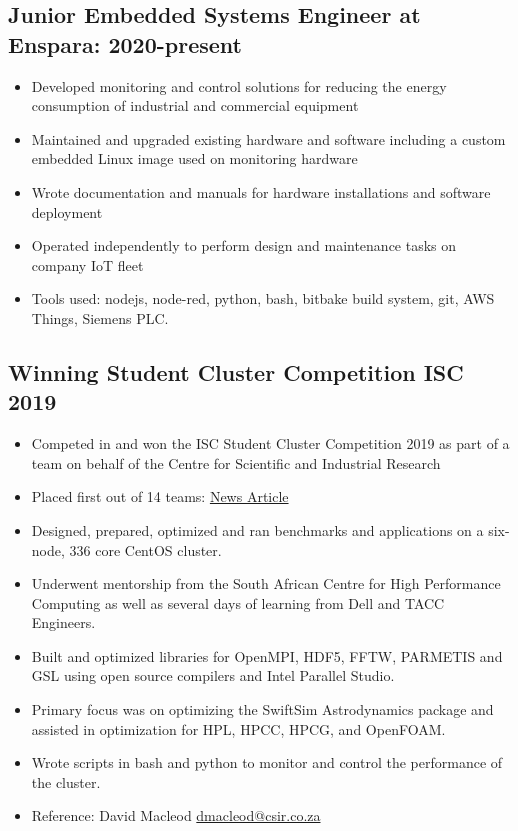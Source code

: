 \documentclass[10pt,a4paper,notitlepage]{article}
\begin{document}
\subsection*{Junior Embedded Systems Engineer at Enspara: 2020-present}
\begin{itemize}[noitemsep]
	\setlength\itemsep{0.02em}
    \item Developed monitoring and control solutions for reducing the energy consumption of industrial and commercial equipment
    \item Maintained and upgraded existing hardware and software including a custom embedded Linux image used on monitoring hardware
    \item Wrote documentation and manuals for hardware installations and software deployment
    \item Operated independently to perform design and maintenance tasks on company IoT fleet
    \item Tools used: nodejs, node-red, python, bash, bitbake build system, git, AWS Things, Siemens PLC.
\end{itemize}

\subsection*{Winning Student Cluster Competition ISC 2019}
\begin{itemize}[noitemsep]
	\setlength\itemsep{0.02em}
    \item Competed in and won the ISC Student Cluster Competition 2019 as part of a team on behalf of the Centre for Scientific and Industrial Research
    \item Placed first out of 14 teams: \href{https://www.chpc.ac.za/index.php/news2/241-south-africa-wins-international-student-cluster-competition-for-the-fourth-time}{News Article}
    \item Designed, prepared, optimized and ran benchmarks and applications on a six-node, 336 core CentOS cluster.
    \item Underwent mentorship from the South African Centre for High Performance Computing as well
        as several days of learning from Dell and TACC Engineers.
    \item Built and optimized libraries for OpenMPI, HDF5, FFTW, PARMETIS and GSL using open source compilers and Intel Parallel Studio.
    \item Primary focus was on optimizing the SwiftSim Astrodynamics package and assisted in optimization for HPL, HPCC, HPCG, and OpenFOAM.
    \item Wrote scripts in bash and python to monitor and control the performance of the cluster. 
    \item Reference: David Macleod \href{mailto:dmacleod@csir.co.za}{dmacleod@csir.co.za}
\end{itemize}
\end{document}
